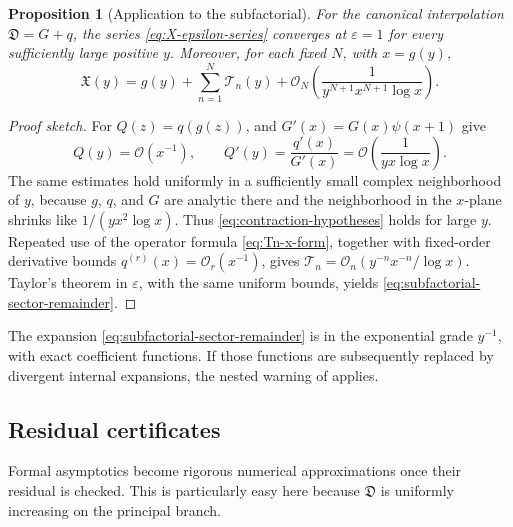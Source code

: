 \documentclass[11pt,oneside]{article}
\theoremstyle{plain}
\newtheorem{proposition}[theorem]{Proposition}
\theoremstyle{definition}
\theoremstyle{remark}
\newcommand{\Dfrak}{\mathfrak{D}}
\newcommand{\Xfrak}{\mathfrak{X}}
\newcommand{\Tcal}{\mathcal{T}}
\newcommand{\bigO}{\mathcal{O}}
\begin{document}
\begin{proposition}[Application to the subfactorial]
\label{prop:subfactorial-convergence}
For the canonical interpolation \(\Dfrak=G+q\), the series
\eqref{eq:X-epsilon-series} converges at \(\varepsilon=1\) for every
sufficiently large positive \(y\).  Moreover, for each fixed \(N\), with
\(x=g(y)\),
\begin{equation}
 \Xfrak(y)=g(y)+\sum_{n=1}^{N}\Tcal_n(y)
 +\bigO_N\!\left(
 \frac{1}{y^{N+1}x^{N+1}\log x}
 \right).
 \label{eq:subfactorial-sector-remainder}
\end{equation}
\end{proposition}
\begin{proof}[Proof sketch]
For \(Q(z)=q(g(z))\),  and
\(G'(x)=G(x)\psi(x+1)\) give
\begin{equation}
 Q(y)=\bigO(x^{-1}),
 \qquad
 Q'(y)=\frac{q'(x)}{G'(x)}
 =\bigO\!\left(\frac{1}{yx\log x}\right).
 \label{eq:Q-smallness}
\end{equation}
The same estimates hold uniformly in a sufficiently small complex
neighborhood of \(y\), because \(g\), \(q\), and \(G\) are analytic there and
the neighborhood in the \(x\)-plane shrinks like
\(1/(yx^2\log x)\).  Thus \eqref{eq:contraction-hypotheses} holds for large
\(y\).  Repeated use of the operator formula
\eqref{eq:Tn-x-form}, together with fixed-order derivative bounds
\(q^{(r)}(x)=\bigO_r(x^{-1})\), gives
\(\Tcal_n=\bigO_n(y^{-n}x^{-n}/\log x)\).  Taylor's theorem in
\(\varepsilon\), with the same uniform bounds, yields
\eqref{eq:subfactorial-sector-remainder}.
\end{proof}

The expansion \eqref{eq:subfactorial-sector-remainder} is in the exponential
grade \(y^{-1}\), with exact coefficient functions.  If those functions are
subsequently replaced by divergent internal expansions, the nested warning of
 applies.

\subsection{Residual certificates}

Formal asymptotics become rigorous numerical approximations once their
residual is checked.  This is particularly easy here because \(\Dfrak\) is
uniformly increasing on the principal branch.
\end{document}
